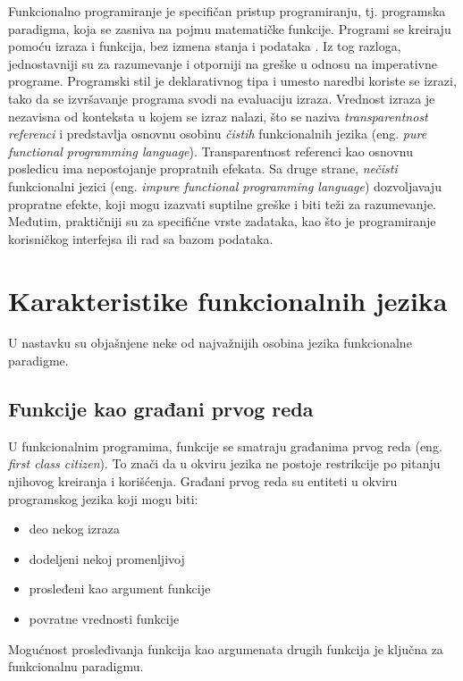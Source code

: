 \documentclass[12pt,oneside]{memoir}
\begin{document}
\par Funkcionalno programiranje je specifičan pristup programiranju, tj. programska paradigma, koja se zasniva na pojmu matematičke funkcije. Programi se kreiraju pomoću izraza i funkcija, bez izmena stanja i podataka \cite{func}. Iz tog razloga, jednostavniji su za razumevanje i otporniji na greške u odnosu na imperativne programe. Programski stil je deklarativnog tipa i umesto naredbi koriste se izrazi, tako da se izvršavanje programa svodi na evaluaciju izraza. Vrednost izraza je nezavisna od konteksta u kojem se izraz nalazi, što se naziva \emph{transparentnost referenci} i predstavlja osnovnu osobinu \emph{čistih} funkcionalnih jezika (eng. \textit{pure functional programming language}). Transparentnost referenci kao osnovnu posledicu ima nepostojanje propratnih efekata. Sa druge strane, \emph{nečisti} funkcionalni jezici (eng. \textit{impure functional programming language}) dozvoljavaju propratne efekte, koji mogu izazvati suptilne greške i biti teži za razumevanje. Međutim, praktičniji su za specifične vrste zadataka, kao što je programiranje korisničkog interfejsa ili rad sa bazom podataka. 


\section{Karakteristike funkcionalnih jezika}
U nastavku su objašnjene neke od najvažnijih osobina jezika funkcionalne paradigme. 

\subsection{Funkcije kao građani prvog reda}
U funkcionalnim programima, funkcije se smatraju građanima prvog reda (eng. \emph{first class citizen}). To znači da u okviru jezika ne postoje restrikcije po pitanju njihovog kreiranja i korišćenja. Građani prvog reda su entiteti u okviru programskog jezika koji mogu biti:
\begin{itemize}
\item deo nekog izraza
\item dodeljeni nekoj promenljivoj
\item prosleđeni kao argument funkcije
\item povratne vrednosti funkcije
\end{itemize}
Mogućnost prosleđivanja funkcija kao argumenata drugih funkcija je ključna za funkcionalnu paradigmu. 
\end{document}
